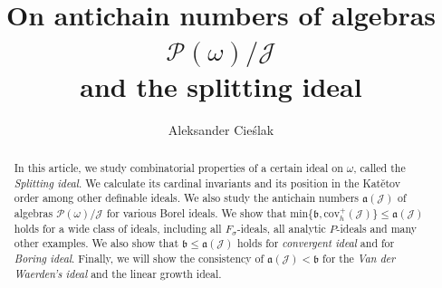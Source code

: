 \documentclass[a4paper]{amsart}
\title{On antichain numbers of algebras $\mathcal{P}(\omega)/\mathcal{J}$\\ and the splitting ideal}
\author{Aleksander Cieślak}
\begin{document}
\begin{abstract}
    In this article, we study combinatorial properties of a certain ideal on $\omega$, called the \emph{Splitting ideal}. We calculate its cardinal invariants and its position in the Katětov order among other definable ideals. We also study the antichain numbers $\mathfrak{a}(\mathcal{J})$ of algebras $\mathcal{P}(\omega)/\mathcal{J}$ for various Borel ideals. We show that $\textrm{min}\{\mathfrak{b},\textrm{cov}^{+}_{h}(\mathcal{J})\}\leq\mathfrak{a}(\mathcal{J})$ holds for a wide class of ideals, including all $F_{\sigma}$-ideals, all analytic $P$-ideals and many other examples. We also show that $\mathfrak{b}\leq\mathfrak{a}(\mathcal{J})$ holds for \emph{convergent ideal} and for \emph{Boring ideal}. Finally, we will show the consistency of $\mathfrak{a}(\mathcal{J})<\mathfrak{b}$ for the \emph{Van der Waerden's ideal} and the linear growth ideal.
\end{abstract}
\maketitle
\end{document}
